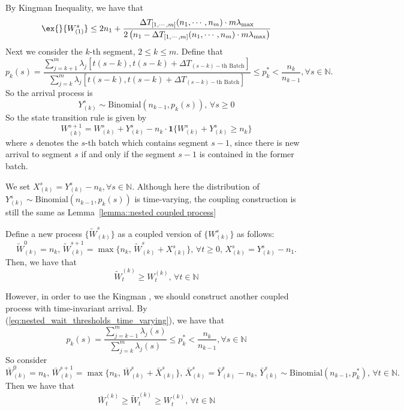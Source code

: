 By Kingman Inequality, we have that
$$  \ex{}{W_{(1)}^s}\leq  2n_1 + \frac{\Delta T_{ [1,\cdots,m]}(n_1,\cdots,n_m)\cdot m\lambda_{\max}}{2\left(n_1 - \Delta T_{ [1,\cdots,m]}(n_1,\cdots,n_m)\cdot m\lambda_{\max}\right)} $$
Next we consider the $k$-th segment, $2\leq k\leq m$. Define that 
$$p_k(s) = \frac{\sum_{j=k+1}^m \lambda_j[ t(s-k), t(s-k)+\Delta T_{(s-k)-\text{th Batch}} ]}{\sum_{j=k}^m \lambda_j[ t(s-k), t(s-k)+\Delta T_{(s-k)-\text{th Batch}} ]}\leq p_k^* < \frac{n_k}{n_{k-1}}, \forall s \in \mathbb{N}.$$
So the arrival process is 
$$Y_{(k)}^s \sim \text{Binomial}(n_{k-1},p_k(s)),\, \forall s\geq 0$$
So the state transition rule is given by
$$W_{(k)}^{s+1} = W_{(k)}^{s} + Y_{(k)}^{s} - n_k \cdot\mathbf{1}\{ W_{(k)}^{s} + Y_{(k)}^{s}\geq n_k \} $$
where $s$ denotes the $s$-th batch which contains segment $s-1$, since there is new arrival to segment $s$ if and only if the segment $s-1$ is contained in the former batch.

We set $X_{(k)}^s  =  Y_{(k)}^s - n_k, \forall s\in \mathbb{N}$. Although here the distribution of $Y_{(k)}^s\sim \text{Binomial}(n_{k-1},p_k(s))$ is time-varying, the coupling construction is still the same as Lemma~\ref{lemma::nested coupled process}
\begin{lemma}\label{lemma: coupling, time varying}
Define a new process $\{ \tilde{W}_{(k)}^s\}$ as a coupled version of $\{  W_{(k)}^s \}$ as follows:
$$ \tilde{W}_{(k)}^0=n_k, \, \tilde{W}_{(k)}^{s+1} = \max\{ n_k, \, \tilde{W}_{(k)}^s+X_{(k)}^s\},\, \forall t\geq 0 ,\, X_{(k)}^s = Y_{(k)}^s - n_1. $$
Then, we have that 
$$ \tilde{W}_t^{(k)}\geq W_t^{(k)},\,\forall t\in \mathbb{N} $$
\end{lemma}
However, in order to use the Kingman , we should construct another coupled process with time-invariant arrival. By (\ref{eq:nested_wait_thresholds_time_varying}), we have that 
$$p_k(s) = \frac{\sum_{j=k-1}^m \lambda_j(s) }{ \sum_{j=k}^m \lambda_j(s)}\leq p_k^* < \frac{n_k}{n_{k-1}}, \forall s\in\mathbb{N}$$
So consider
$$\bar{W}_{(k)}^0=n_k,\, \bar{W}_{(k)}^{s+1} = \max\{ n_k,\, \bar{W}_{(k)}^{s}+\bar{X}_{(k)}^s \}, \,\bar{X}_{(k)}^s =\bar{Y}_{(k)}^s  -n_k, \, \bar{Y}_{(k)}^s \sim \text{Binomial}(n_{k-1}, p_k^*),\,\forall t\in \mathbb{N}.  $$
Then we have that 
$$\bar{W}_t^{(k)}\geq \tilde{W}_t^{(k)}\geq W_t^{(k)},\,\forall t\in \mathbb{N} $$

